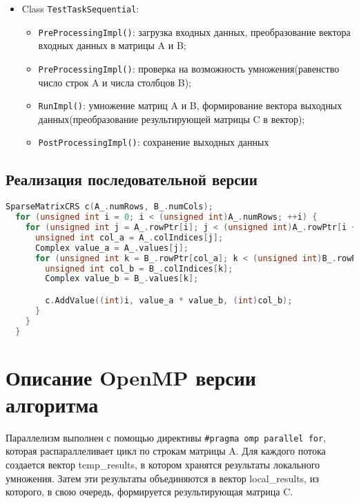 \documentclass[14pt,a4paper]{extarticle}
\begin{document}
\begin{itemize}
    \item Class \texttt{TestTaskSequential}:
    \begin{itemize}
        \item \texttt{PreProcessingImpl()}: загрузка входных данных, преобразование вектора входных данных в матрицы A и B;
        \item \texttt{PreProcessingImpl()}: проверка на возможность умножения(равенство число строк A и числа столбцов B);
        \item \texttt{RunImpl()}: умножение матриц A и B, формирование вектора выходных данных(преобразование результирующей матрицы C в вектор);
        \item \texttt{PostProcessingImpl()}: сохранение выходных данных
    \end{itemize}
\end{itemize}

\subsection*{Реализация последовательной версии}
\begin{lstlisting}[language=C++]
  SparseMatrixCRS c(A_.numRows, B_.numCols);
  for (unsigned int i = 0; i < (unsigned int)A_.numRows; ++i) {
    for (unsigned int j = A_.rowPtr[i]; j < (unsigned int)A_.rowPtr[i + 1]; ++j) {
      unsigned int col_a = A_.colIndices[j];
      Complex value_a = A_.values[j];
      for (unsigned int k = B_.rowPtr[col_a]; k < (unsigned int)B_.rowPtr[col_a + 1]; ++k) {
        unsigned int col_b = B_.colIndices[k];
        Complex value_b = B_.values[k];

        c.AddValue((int)i, value_a * value_b, (int)col_b);
      }
    }
  }
\end{lstlisting}

\section{Описание OpenMP версии алгоритма}

Параллелизм выполнен с помощью директивы \texttt{\#pragma omp parallel for}, которая распараллеливает цикл по строкам матрицы A. Для каждого потока создается вектор temp\_results, в котором хранятся результаты локального умножения. Затем эти результаты объединяются в вектор local\_results, из которого, в свою очередь, формируется результирующая матрица C.
\end{document}

